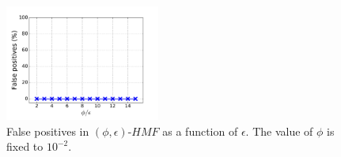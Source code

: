 
\begin{figure}[t!]
\begin{center}
\includegraphics[width=2.0in]{figure/fp}
\caption{False positives in $(\phi, \epsilon)\mbox{-}HMF$ as a function of $\epsilon$. The value of $\phi$ is fixed to $10^{-2}$.}
\label{fig:fp}
\end{center}
\end{figure}